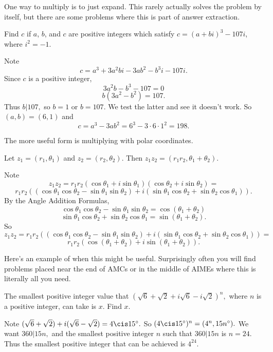 \documentclass[mast]{lucky}
\begin{document}
One way to multiply is to just expand. This rarely actually solves the problem by itself, but there are some problems where this is part of answer extraction.

\begin{exam}[AIME 1985/3]
Find $c$ if $a$, $b$, and $c$ are positive integers which satisfy $c=(a + bi)^3 - 107i$, where $i^2 = -1$.
\end{exam}

\begin{sol}
Note
\[c=a^3+3a^2bi-3ab^2-b^3i-107i.\]
Since $c$ is a positive integer,
\[3a^2b-b^3-107=0\]
\[b(3a^2-b^2)=107.\]
Thus $b|107,$ so $b=1$ or $b=107.$ We test the latter and see it doesn't work. So $(a,b)=(6,1)$ and
\[c=a^3-3ab^2=6^3-3\cdot 6\cdot 1^2=198.\]
\end{sol}

The more useful form is multiplying with polar coordinates.

\begin{theo}
Let $z_1=(r_1,\theta_1)$ and $z_2=(r_2,\theta_2).$ Then $z_1z_2=(r_1r_2,\theta_1+\theta_2).$
\end{theo}

\begin{pro}
Note
\[z_1z_2=r_1r_2(\cos\theta_1+i\sin\theta_1)(\cos\theta_2+i\sin\theta_2)=\]
\[r_1r_2((\cos\theta_1\cos\theta_2-\sin\theta_1\sin\theta_2)+i(\sin\theta_1\cos\theta_2+\sin\theta_2\cos\theta_1)).\]
By the Angle Addition Formulas,
\[\cos\theta_1\cos\theta_2-\sin\theta_1\sin\theta_2=\cos(\theta_1+\theta_2)\]
\[\sin\theta_1\cos\theta_2+\sin\theta_2\cos\theta_1=\sin(\theta_1+\theta_2).\]
So
\[z_1z_2=r_1r_2((\cos\theta_1\cos\theta_2-\sin\theta_1\sin\theta_2)+i(\sin\theta_1\cos\theta_2+\sin\theta_2\cos\theta_1))=\]
\[r_1r_2(\cos(\theta_1+\theta_2)+i\sin(\theta_1+\theta_2)).\]
\end{pro}

Here's an example of when this might be useful. Surprisingly often you will find problems placed near the end of AMCs or in the middle of AIMEs where this is literally all you need.

\begin{exam}
The smallest positive integer value that $(\sqrt{6}+\sqrt{2}+i\sqrt{6}-i\sqrt{2})^n,$ where $n$ is a positive integer, can take is $x.$ Find $x.$
\end{exam}

\begin{sol}
Note $(\sqrt{6}+\sqrt{2})+i(\sqrt{6}-\sqrt{2})=4\cis 15^{\circ}.$ So $(4\cis 15^{\circ})^n=(4^n,15n^{\circ}).$ We want $360|15n,$ and the smallest positive integer $n$ such that $360|15n$ is $n=24.$ Thus the smallest positive integer that can be achieved is $4^{24}.$
\end{sol}
\end{document}
